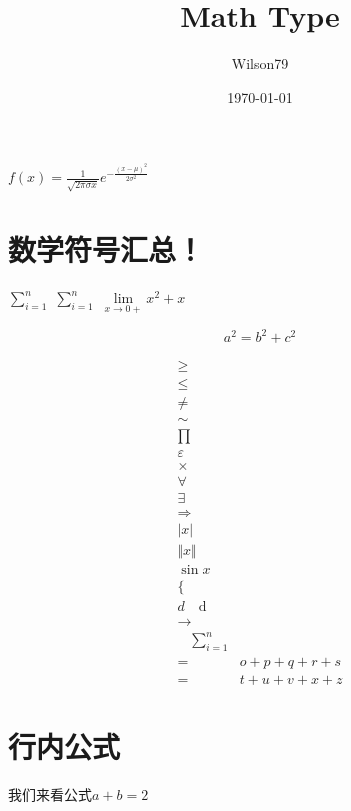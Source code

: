 \documentclass{article}
\title{Math Type}
\author{Wilson79}
\date{\today}
\begin{document}
 
    \tableofcontents %
    \maketitle %
    
    $f(x)=\frac{1}{\sqrt{2 \pi \sigma x}} e^{-\frac{(x-\mu)^{2}}{2 \sigma^{2}}}$

\section{数学符号汇总！}
    
    $\sum _{i=1}^{n}$ %
    $\sum \limits_{i=1}^{n}$
    $\lim\limits _{x \rightarrow 0+} x^2 + x$ 


    \[a^2 = b ^2 + c^2 \tag{*}\] %

    \[
    \begin{aligned}  %
        \geq \\ %
        \leq \\ %
        \neq \\ %
        \sim \\ %
        \prod \\ %
        \varepsilon \\
        \times \\ %
        \forall \\ %
        \exists \\ %
        \Rightarrow \\ 
        \vert x \vert \\ %
        \Vert x \Vert \\ %
        \sin x \\ %
        \{  \\  %
        d \quad \mathrm{d} \\ %
        \rightarrow \\ %
        \quad %
        \sum\limits_{i=1}^{n} \\ %
        =& o+p+q+r+s \\ 
        =& t+u+v+x+z 
    \end{aligned}
    \]
    

    

\section{行内公式} %
    我们来看公式$a+b=2$ %
\end{document}

